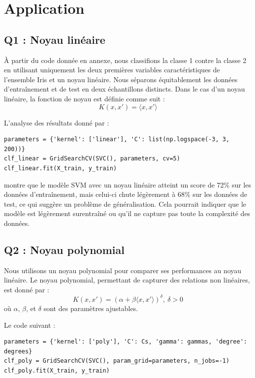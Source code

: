 \documentclass{scrartcl}
\begin{document}
\section{Application}

\subsection{Q1 : Noyau linéaire}
\hspace{7pt} À partir du code donnée en annexe, nous classifions la classe 1 contre la classe 2 en utilisant uniquement les deux premières variables caractéristiques de l'ensemble Iris et un noyau linéaire. Nous séparons équitablement les données d'entraînement et de test en deux échantillons distincts. Dans le cas d'un noyau linéaire, la fonction de noyau est définie comme suit :
\[
K(x, x') = \langle x, x' \rangle
\]
    
L'analyse des résultats donné par :
\begin{lstlisting}
parameters = {'kernel': ['linear'], 'C': list(np.logspace(-3, 3, 200))}
clf_linear = GridSearchCV(SVC(), parameters, cv=5)
clf_linear.fit(X_train, y_train)
\end{lstlisting}
montre que le modèle SVM avec un noyau linéaire atteint un score de 72\% sur les données d'entraînement, mais celui-ci chute légèrement à 68\% sur les données de test, ce qui suggère un problème de généralisation. Cela pourrait indiquer que le modèle est légèrement surentraîné ou qu'il ne capture pas toute la complexité des données.

\subsection{Q2 : Noyau polynomial}

\hspace{7pt} Nous utilisons un noyau polynomial pour comparer ses performances au noyau linéaire. Le noyau polynomial, permettant de capturer des relations non linéaires, est donné par :
\[
K(x, x') = (\alpha + \beta \langle x, x' \rangle)^\delta, \ \delta > 0
\]
    où \(\alpha\), \(\beta\), et \(\delta\) sont des paramètres ajustables.\newline

Le code suivant :
\begin{lstlisting}
parameters = {'kernel': ['poly'], 'C': Cs, 'gamma': gammas, 'degree': degrees}
clf_poly = GridSearchCV(SVC(), param_grid=parameters, n_jobs=-1)
clf_poly.fit(X_train, y_train)
\end{lstlisting}
    
\end{document}
